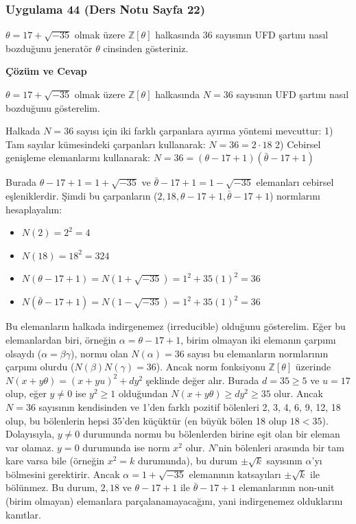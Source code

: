 \documentclass[11pt, a4paper]{article}
\newenvironment{cozum}{
    \vspace{0.5cm}
    \noindent\textcolor{green!60!black}{\faCheckCircle\enspace \textbf{\Large Çözüm ve Cevap}}\par\vspace{0.2cm}
}{}
\begin{document}
\subsubsection{Uygulama 44 (Ders Notu Sayfa 22)}
\begin{sorubox}
$\theta = 17 + \sqrt{-35}$ olmak üzere $\mathbb{Z}[\theta]$ halkasında $36$ sayısının UFD şartını nasıl bozduğunu jeneratör $\theta$ cinsinden gösteriniz.
\end{sorubox}
\begin{cozum}
$\theta = 17 + \sqrt{-35}$ olmak üzere $\mathbb{Z}[\theta]$ halkasında $N = 36$ sayısının UFD şartını nasıl bozduğunu gösterelim.

Halkada $N = 36$ sayısı için iki farklı çarpanlara ayırma yöntemi mevcuttur:
1) Tam sayılar kümesindeki çarpanları kullanarak: $N = 36 = 2 \cdot 18$
2) Cebirsel genişleme elemanlarını kullanarak: $N = 36 = (\theta - 17 + 1)(\bar{\theta} - 17 + 1)$

Burada $\theta - 17 + 1 = 1 + \sqrt{-35}$ ve $\bar{\theta} - 17 + 1 = 1 - \sqrt{-35}$ elemanları cebirsel eşleniklerdir. Şimdi bu çarpanların ($2, 18, \theta - 17 + 1, \bar{\theta} - 17 + 1$) normlarını hesaplayalım:
\begin{itemize}
    \item $N(2) = 2^2 = 4$
    \item $N(18) = 18^2 = 324$
    \item $N(\theta - 17 + 1) = N(1 + \sqrt{-35}) = 1^2 + 35(1)^2 = 36$
    \item $N(\bar{\theta} - 17 + 1) = N(1 - \sqrt{-35}) = 1^2 + 35(1)^2 = 36$
\end{itemize}

Bu elemanların halkada indirgenemez (irreducible) olduğunu gösterelim. Eğer bu elemanlardan biri, örneğin $\alpha = \theta - 17 + 1$, birim olmayan iki elemanın çarpımı olsaydı ($\alpha = \beta \gamma$), normu olan $N(\alpha) = 36$ sayısı bu elemanların normlarının çarpımı olurdu ($N(\beta)N(\gamma) = 36$). Ancak norm fonksiyonu $\mathbb{Z}[\theta]$ üzerinde $N(x+y\theta) = (x+yu)^2 + dy^2$ şeklinde değer alır. Burada $d = 35 \ge 5$ ve $u = 17$ olup, eğer $y \neq 0$ ise $y^2 \ge 1$ olduğundan $N(x+y\theta) \ge dy^2 \ge 35$ olur. Ancak $N = 36$ sayısının kendisinden ve 1'den farklı pozitif bölenleri 2, 3, 4, 6, 9, 12, 18 olup, bu bölenlerin hepsi $35$'den küçüktür (en büyük bölen 18 olup $18 < 35$). Dolayısıyla, $y \neq 0$ durumunda normu bu bölenlerden birine eşit olan bir eleman var olamaz. $y = 0$ durumunda ise norm $x^2$ olur. $N$'nin bölenleri arasında bir tam kare varsa bile (örneğin $x^2 = k$ durumunda), bu durum $\pm \sqrt{k}$ sayısının $\alpha$'yı bölmesini gerektirir. Ancak $\alpha = 1+\sqrt{-35}$ elemanının katsayıları $\pm \sqrt{k}$ ile bölünmez. Bu durum, $2, 18$ ve $\theta - 17 + 1$ ile $\bar{\theta} - 17 + 1$ elemanlarının non-unit (birim olmayan) elemanlara parçalanamayacağını, yani indirgenemez olduklarını kanıtlar.


\end{cozum}
\end{document}

